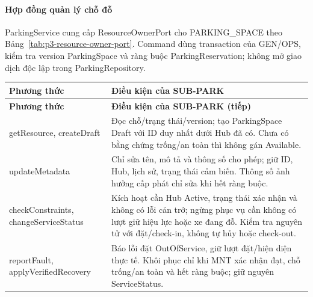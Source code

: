 \paragraph{Hợp đồng quản lý chỗ đỗ}
ParkingService cung cấp ResourceOwnerPort cho PARKING\_SPACE theo Bảng~\ref{tab:p3-resource-owner-port}. Command dùng transaction của GEN/OPS, kiểm tra version ParkingSpace và ràng buộc ParkingReservation; không mở giao dịch độc lập trong ParkingRepository.

\begingroup
\renewcommand{\theHtable}{owner.park}
\begin{longtable}{|L{58mm}|L{81mm}|}
\hline
\textbf{Phương thức} & \textbf{Điều kiện của SUB-PARK}\\\hline
\endfirsthead
\hline\textbf{Phương thức} & \textbf{Điều kiện của SUB-PARK (tiếp)}\\\hline\endhead
getResource, createDraft & Đọc chỗ/trạng thái/version; tạo ParkingSpace Draft với ID duy nhất dưới Hub đã có. Chưa có bằng chứng trống/an toàn thì không gán Available.\\\hline
updateMetadata & Chỉ sửa tên, mô tả và thông số cho phép; giữ ID, Hub, lịch sử, trạng thái cảm biến. Thông số ảnh hưởng cấp phát chỉ sửa khi hết ràng buộc.\\\hline
checkConstraints, changeServiceStatus & Kích hoạt cần Hub Active, trạng thái xác nhận và không có lỗi cản trở; ngừng phục vụ cần không có lượt giữ hiệu lực hoặc xe đang đỗ. Kiểm tra nguyên tử với đặt/check-in, không tự hủy hoặc check-out.\\\hline
reportFault, applyVerifiedRecovery & Báo lỗi đặt OutOfService, giữ lượt đặt/hiện diện thực tế. Khôi phục chỉ khi MNT xác nhận đạt, chỗ trống/an toàn và hết ràng buộc; giữ nguyên ServiceStatus.\\\hline
\end{longtable}
\addtocounter{table}{-1}
\endgroup

